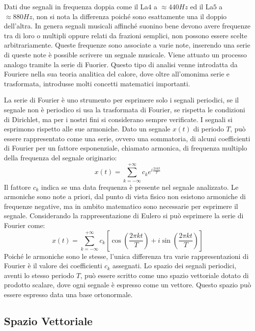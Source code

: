 \documentclass{article}
\numberwithin{equation}{subsection}
\begin{document}
Dati due segnali in frequenza doppia come il La$4$ a $\approx 440Hz$ ed il La$5$ a $\approx 880Hz$, non si nota la differenza poiché sono esattamente una il doppio dell'altra. 
In genera segnali musicali affinché suonino bene devono avere frequenze tra di loro o multipli oppure relati da frazioni semplici, non possono essere scelte arbitrariamente. 
Queste frequenze sono associate a varie note, inserendo una serie di queste note è possible scrivere un segnale musicale. Viene attuato un processo analogo tramite la serie di 
Fuorier. Questo tipo di analisi venne introdatta da Fouriere nella sua teoria analitica del calore, dove oltre all'omonima serie e trasformata, introdusse molti concetti 
matematici importanti. 



La serie di Fourier è uno strumento per esprimere solo i segnali periodici, 
se il segnale non è periodico si usa la trasformata di Fourier, se rispetta le condizioni di Dirichlet, ma per i nostri fini si considerano sempre verificate. 
I segnali si esprimono rispetto alle sue armoniche. Dato un segnale $x(t)$ di periodo $T$, può essere rappresentato come una serie, ovvero una sommatoria, di alcuni 
coefficienti di Fourier per un fattore esponenziale, chiamato armonica, di frequenza multiplo della frequenza del segnale originario:
\begin{equation*}
    x(t)=\displaystyle\sum_{k=-\infty}^{+\infty}c_ke^{i\frac{2\pi  k t}{T}}
\end{equation*}
Il fattore $c_k$ indica se una data frequenza è presente nel segnale analizzato. Le armoniche sono note a priori, dal punto di vista fisico non esistono armoniche di frequenze 
negative, ma in ambito matematico sono necessarie per esprimere il segnale. Considerando la rappresentazione di Eulero si può esprimere la serie di Fourier come:
\begin{equation*}
    x(t)=\displaystyle\sum_{k=-\infty}^{+\infty}c_k\left[\cos\left(\frac{2\pi k t}{T}\right)+i\sin\left(\frac{2\pi k t}{T}\right)\right]
\end{equation*}
Poiché le armoniche sono le stesse, l'unica differenza tra varie rappresentazioni di Fourier è il valore dei coefficienti $c_k$ assegnati. Lo spazio dei segnali periodici, 
aventi lo stesso periodo $T$, può essere scritto come uno spazio vettoriale dotato di prodotto scalare, dove ogni segnale è espresso come un vettore. Questo spazio può essere 
espresso data una base ortonormale.

\subsection{Spazio Vettoriale}
\end{document}
